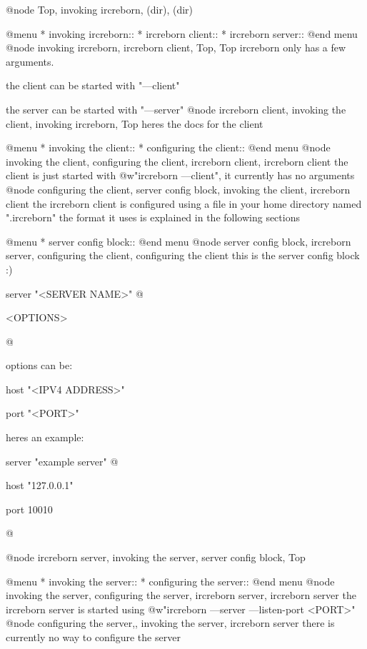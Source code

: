 
@node Top, invoking ircreborn, (dir), (dir)

@menu
* invoking ircreborn::
* ircreborn client::
* ircreborn server::
@end menu
@node invoking ircreborn, ircreborn client, Top, Top
ircreborn only has a few arguments.

the client can be started with "---client"

the server can be started with "---server"
@node ircreborn client, invoking the client, invoking ircreborn, Top
heres the docs for the client

@menu
* invoking the client::
* configuring the client::
@end menu
@node invoking the client, configuring the client, ircreborn client, ircreborn client
the client is just started with @w{"ircreborn ---client"}, it currently has no arguments
@node configuring the client, server config block, invoking the client, ircreborn client
the ircreborn client is configured using a file in your home directory named ".ircreborn"
the format it uses is explained in the following sections

@menu
* server config block::
@end menu
@node server config block, ircreborn server, configuring the client, configuring the client
this is the server config block :)

server "<SERVER NAME>" @{

    <OPTIONS>

@}

options can be:

host "<IPV4 ADDRESS>"

port "<PORT>"

heres an example:

server "example server" @{

    host "127.0.0.1"

    port 10010

@}
@node ircreborn server, invoking the server, server config block, Top

@menu
* invoking the server::
* configuring the server::
@end menu
@node invoking the server, configuring the server, ircreborn server, ircreborn server
the ircreborn server is started using @w{"ircreborn ---server ---listen-port <PORT>"}
@node configuring the server,, invoking the server, ircreborn server
there is currently no way to configure the server